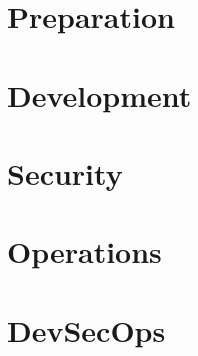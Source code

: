 




\frontmatter{}


%

\tableofcontents
\listoffigures
\listoftables

\mainmatter{}


\part{Preparation} %



\part{Development} %







\part{Security} %



\part{Operations} %






\part{DevSecOps} %


\backmatter{}
\printindex
\nocite{*}





